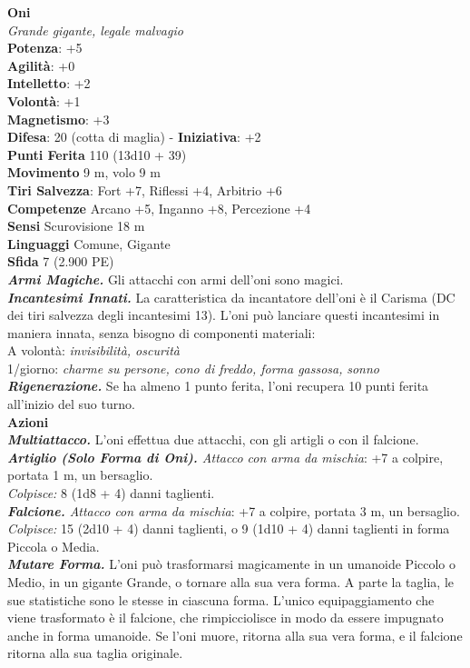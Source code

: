 \begin{multicols}{2}
\medskip\textbf{Oni}\\
\emph{Grande gigante, legale malvagio}\\
\textbf{Potenza}: +5\\
\textbf{Agilità}: +0\\
\textbf{Intelletto}: +2\\
\textbf{Volontà}: +1\\
\textbf{Magnetismo}: +3\\
\textbf{Difesa}: 20 (cotta di maglia) - \textbf{Iniziativa}: +2\\
\textbf{Punti Ferita} 110 (13d10 + 39)\\
\textbf{Movimento} 9 m, volo 9 m  \\
\textbf{Tiri Salvezza}: Fort +7, Riflessi +4, Arbitrio +6\\
\textbf{Competenze} Arcano +5, Inganno +8, Percezione +4\\
\textbf{Sensi} Scurovisione 18 m\\
\textbf{Linguaggi} Comune, Gigante\\
\textbf{Sfida} 7 (2.900 PE)\smallskip\\
\emph{\textbf{Armi Magiche.}} Gli attacchi con armi dell'oni sono magici.\\
\emph{\textbf{Incantesimi Innati.}} La caratteristica da incantatore dell'oni è il Carisma (DC dei tiri salvezza degli incantesimi 13). L'oni può lanciare questi incantesimi in maniera innata, senza bisogno di componenti materiali:\\
A volontà: \emph{invisibilità, oscurità}\\
1/giorno: \emph{charme su persone, cono di freddo, forma gassosa,} \emph{sonno}\\
\emph{\textbf{Rigenerazione.}} Se ha almeno 1 punto ferita, l'oni recupera 10 punti ferita all'inizio del suo turno.\\
\smallskip\textbf{Azioni}\\
\emph{\textbf{Multiattacco.}} L'oni effettua due attacchi, con gli artigli o con il falcione.\\
\emph{\textbf{Artiglio (Solo Forma di Oni).} Attacco con arma da mischia}: +7 a colpire, portata 1 m, un bersaglio.\\
\emph{Colpisce:} 8 (1d8 + 4) danni taglienti.\\
\emph{\textbf{Falcione.} Attacco con arma da mischia}: +7 a colpire, portata 3 m, un bersaglio.\\
\emph{Colpisce:} 15 (2d10 + 4) danni taglienti, o 9 (1d10 + 4) danni taglienti in forma Piccola o Media.\\
\emph{\textbf{Mutare Forma.}} L'oni può trasformarsi magicamente in un umanoide Piccolo o Medio, in un gigante Grande, o tornare alla sua vera forma. A parte la taglia, le sue statistiche sono le stesse in ciascuna forma. L'unico equipaggiamento che viene trasformato è il falcione, che rimpicciolisce in modo da essere impugnato anche in forma umanoide. Se l'oni muore, ritorna alla sua vera forma, e il falcione ritorna alla sua taglia originale.\\


\end{multicols}
